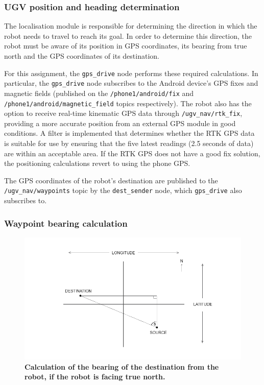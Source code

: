 \documentclass[titlepage,12pt,a4paper]{article}
\begin{document}
\subsubsection{UGV position and heading determination}
The localisation module is responsible for determining the direction in which the robot needs to travel to reach its goal. In order to determine this direction, the robot must be aware of its position in GPS coordinates, its bearing from true north and the GPS coordinates of its destination.

For this assignment, the \verb|gps_drive| node performs these required calculations. In particular, the \verb|gps_drive| node subscribes to the Android device's GPS fixes and magnetic fields (published on the \verb|/phone1/android/fix| and \verb|/phone1/android/magnetic_field| topics respectively). The robot also has the option to receive real-time kinematic GPS data through \verb|/ugv_nav/rtk_fix|, providing a more accurate position from an external GPS module in good conditions. A filter is implemented that determines whether the RTK GPS data is suitable for use by ensuring that the five latest readings (2.5 seconds of data) are within an acceptable area. If the RTK GPS does not have a good fix solution, the positioning calculations revert to using the phone GPS.

The GPS coordinates of the robot's destination are published to the  \verb|/ugv_nav/waypoints| topic by the \verb|dest_sender| node, which \verb|gps_drive| also subscribes to.

\subsubsection{Waypoint bearing calculation}
\begin{figure}[h]
	\centering
	\includegraphics[scale=0.6]{figures/bearings.png}
	\caption{\textbf{Calculation of the bearing of the destination from the robot, if the robot is facing true north.}}
	\label{figure:bearing1}
\end{figure}
\end{document}
